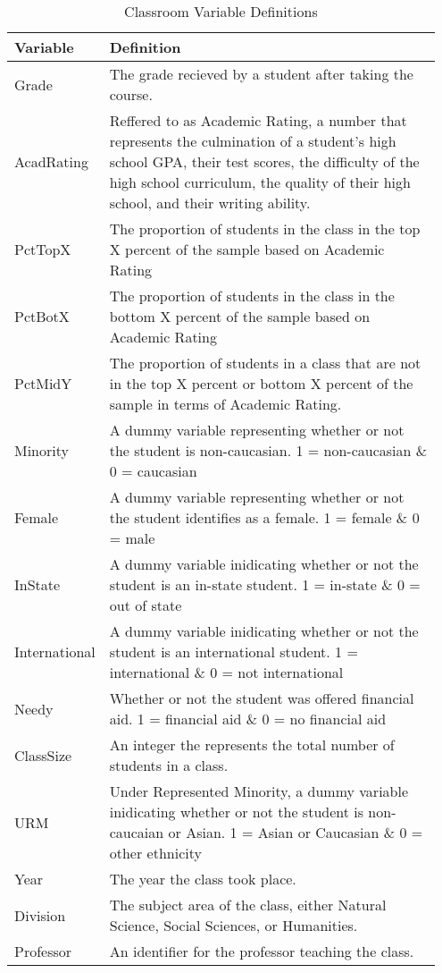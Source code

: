 \documentclass[12pt,a4paper,english,fleqn]{article}
\begin{document}
\clearpage{}

\begin{table}[htb]
\centering
\caption{Classroom Variable Definitions}
 \begin{tabular}{||p{0.15\linewidth}|p{0.8\linewidth}||} 
 \hline
 Variable & Definition \\ [0.5ex] 
 \hline\hline
 Grade & The grade recieved by a student after taking the course. \\ 
 \hline
 AcadRating & Reffered to as Academic Rating, a number that represents the culmination of a student's high school GPA, their test scores, the difficulty of the high school curriculum, the quality of their high school, and their writing ability. \\
 \hline
 PctTopX & The proportion of students in the class in the top X percent of the sample based on Academic Rating \\
 \hline
 PctBotX & The proportion of students in the class in the bottom X percent of the sample based on Academic Rating \\
 \hline
 PctMidY & The proportion of students in a class that are not in the top X percent or bottom X percent of the sample in terms of Academic Rating. \\
 \hline
 Minority & A dummy variable representing whether or not the student is non-caucasian. 1 = non-caucasian \& 0 = caucasian\\
 \hline
 Female & A dummy variable representing whether or not the student identifies as a female. 1 = female \& 0 = male\\
 \hline
 InState & A dummy variable inidicating whether or not the student is an in-state student.  1 = in-state \& 0 = out of state\\
 \hline
 International & A dummy variable inidicating whether or not the student is an international student.  1 = international \& 0 = not international\\
 \hline
 Needy & Whether or not the student was offered financial aid.  1 = financial aid \& 0 = no financial aid\\
 \hline
 ClassSize & An integer the represents the total number of students in a class. \\
 \hline
 URM & Under Represented Minority, a dummy variable inidicating whether or not the student is non-caucaian or Asian.  1 = Asian or Caucasian \& 0 = other ethnicity \\
 \hline
 Year & The year the class took place. \\
 \hline
 Division & The subject area of the class, either Natural Science, Social Sciences, or Humanities. \\
 \hline
 Professor & An identifier for the professor teaching the class. \\
[1ex] 
 \hline
\end{tabular}
\end{table}
\end{document}
